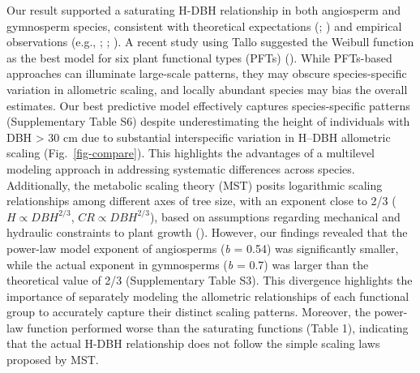 \documentclass[
  12pt,
  letterpaper,
  DIV=11,
  numbers=noendperiod]{scrartcl}
\begin{document}
Our result supported a saturating H-DBH relationship in both angiosperm
and gymnosperm species, consistent with theoretical expectations
(;
) and empirical observations
(e.g., ;
;
). A recent study using Tallo
suggested the Weibull function as the best model for six plant
functional types (PFTs) ().
While PFTs-based approaches can illuminate large-scale patterns, they
may obscure species-specific variation in allometric scaling, and
locally abundant species may bias the overall estimates. Our best
predictive model effectively captures species-specific patterns
(Supplementary Table S6) despite underestimating the height of
individuals with DBH \textgreater{} 30 cm due to substantial
interspecific variation in H--DBH allometric scaling
(Fig.~\ref{fig-compare}). This highlights the advantages of a multilevel
modeling approach in addressing systematic differences across species.
Additionally, the metabolic scaling theory (MST) posits logarithmic
scaling relationships among different axes of tree size, with an
exponent close to 2/3 (\(H \propto DBH^{2/3}\),
\(CR \propto DBH^{2/3}\)), based on assumptions regarding mechanical and
hydraulic constraints to plant growth (). However, our findings revealed that the power-law model
exponent of angiosperms (\emph{b} = 0.54) was significantly smaller,
while the actual exponent in gymnosperms (\emph{b} = 0.7) was larger
than the theoretical value of 2/3 (Supplementary Table S3). This
divergence highlights the importance of separately modeling the
allometric relationships of each functional group to accurately capture
their distinct scaling patterns. Moreover, the power-law function
performed worse than the saturating functions (Table 1), indicating that
the actual H-DBH relationship does not follow the simple scaling laws
proposed by MST.
\end{document}
